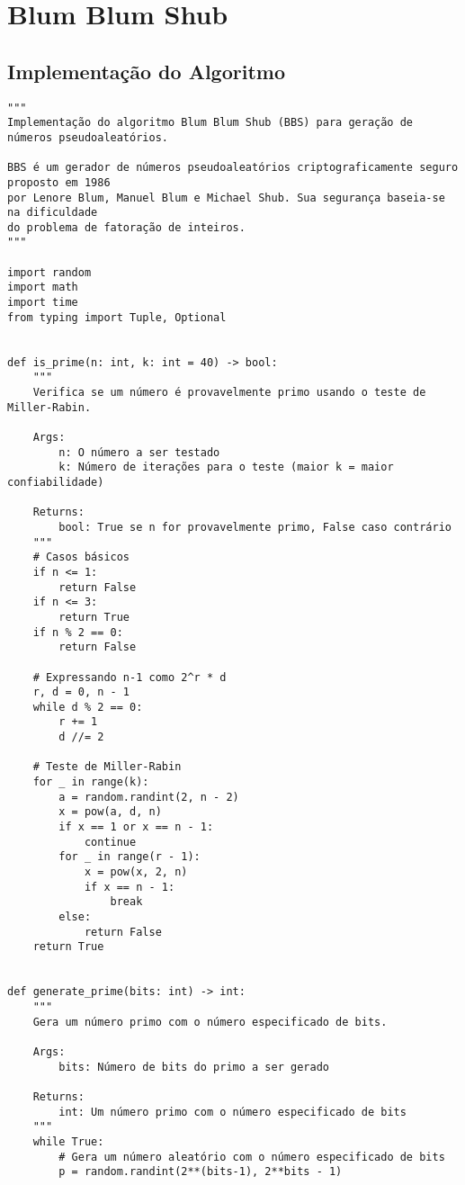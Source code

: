 \section{Blum Blum Shub}\label{apx:bbs-impl}

\subsection{Implementação do Algoritmo}

\begin{verbatim}
"""
Implementação do algoritmo Blum Blum Shub (BBS) para geração de números pseudoaleatórios.

BBS é um gerador de números pseudoaleatórios criptograficamente seguro proposto em 1986
por Lenore Blum, Manuel Blum e Michael Shub. Sua segurança baseia-se na dificuldade
do problema de fatoração de inteiros.
"""

import random
import math
import time
from typing import Tuple, Optional


def is_prime(n: int, k: int = 40) -> bool:
    """
    Verifica se um número é provavelmente primo usando o teste de Miller-Rabin.
    
    Args:
        n: O número a ser testado
        k: Número de iterações para o teste (maior k = maior confiabilidade)
        
    Returns:
        bool: True se n for provavelmente primo, False caso contrário
    """
    # Casos básicos
    if n <= 1:
        return False
    if n <= 3:
        return True
    if n % 2 == 0:
        return False
    
    # Expressando n-1 como 2^r * d
    r, d = 0, n - 1
    while d % 2 == 0:
        r += 1
        d //= 2
    
    # Teste de Miller-Rabin
    for _ in range(k):
        a = random.randint(2, n - 2)
        x = pow(a, d, n)
        if x == 1 or x == n - 1:
            continue
        for _ in range(r - 1):
            x = pow(x, 2, n)
            if x == n - 1:
                break
        else:
            return False
    return True


def generate_prime(bits: int) -> int:
    """
    Gera um número primo com o número especificado de bits.
    
    Args:
        bits: Número de bits do primo a ser gerado
        
    Returns:
        int: Um número primo com o número especificado de bits
    """
    while True:
        # Gera um número aleatório com o número especificado de bits
        p = random.randint(2**(bits-1), 2**bits - 1)
        

\end{verbatim}
